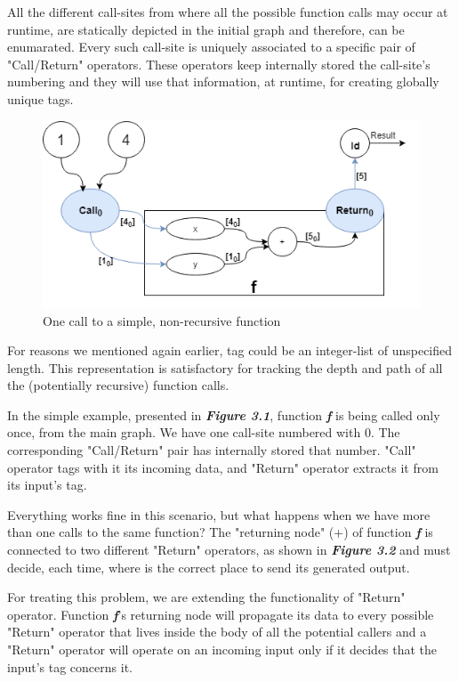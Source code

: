 \documentclass[ack,preface]{dithesis}
\begin{document}
All the different call-sites from where all the possible function calls may occur at runtime, are statically depicted in the initial graph and therefore, can be enumarated.
Every such call-site is uniquely associated to a specific pair of "Call/Return" operators. These operators keep internally stored the call-site's numbering and they will use that information, at runtime, for creating globally unique tags. 

\begin{figure}
\centering
\includegraphics[scale=0.65]{figures/Example1}
\caption{One call to a simple, non-recursive function}
\end{figure}

For reasons we mentioned again earlier, tag could be an integer-list of unspecified length. This representation is satisfactory for tracking the depth and path of all the (potentially recursive) function calls.

In the simple example, presented in \textit{\textbf{Figure 3.1}}, function \textit{\textbf{f}} is being called only once, from the main graph. We have one call-site numbered with 0. The corresponding "Call/Return" pair has internally stored that number. "Call" operator tags with it its incoming data, and "Return" operator extracts it from its input's tag. 

Everything works fine in this scenario, but what happens when we have more than one calls to the same function? 
The "returning node" (+) of function  \textit{\textbf{f}} is connected to  two different "Return" operators, as shown in \textit{\textbf{Figure 3.2}} and must decide, each time,  where is the correct place to send its generated output.

For treating this problem, we are extending the functionality of "Return" operator.  Function \textit{\textbf{f}}'s returning node will  propagate its data to every possible "Return" operator that lives inside the body of all the potential callers and a "Return" operator will operate on an incoming input only if it decides that the input's tag concerns it.
\end{document}
